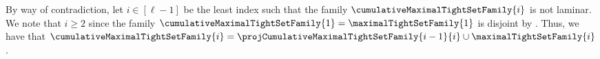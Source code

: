         \item By way of contradiction, let $i \in [\ell - 1]$ be the least index such that the family $\cumulativeMaximalTightSetFamily{i}$  is not laminar. 
        We note that $i \geq 2$ since the family $\cumulativeMaximalTightSetFamily{1} = \maximalTightSetFamily{1}$ is disjoint by . Thus, we have that $\cumulativeMaximalTightSetFamily{i} = \projCumulativeMaximalTightSetFamily{i-1}{i} \cup \maximalTightSetFamily{i}$.
